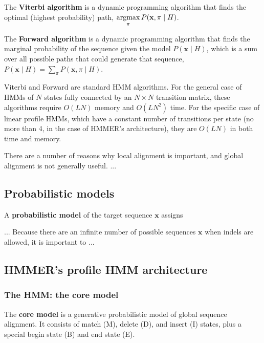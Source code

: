 \documentclass[11pt]{article}
\begin{document}
The \textbf{Viterbi algorithm} is a dynamic programming algorithm that
finds the optimal (highest probability) path, $\mathop{\mathrm{argmax}}\limits_\pi
P(\mathbf{x}, \pi \mid H)$.

The \textbf{Forward algorithm} is a dynamic programming algorithm that
finds the marginal probability of the sequence given the model
$P(\mathbf{x} \mid H)$, which is a sum over all possible paths that
could generate that sequence, $P(\mathbf{x} \mid H) = \sum_\pi
P(\mathbf{x}, \pi \mid H)$. 

Viterbi and Forward are standard HMM algorithms. For the general case
of HMMs of $N$ states fully connected by an $N \times N$ transition
matrix, these algorithms require $O(LN)$ memory and $O(LN^2)$ time.
For the specific case of linear profile HMMs, which have a constant
number of transitions per state (no more than 4, in the case of
HMMER's architecture), they are $O(LN)$ in both time and memory.
















There are a number of reasons why local alignment is important, and
global alignment is not generally useful. ...

\subsection{Probabilistic models}

A \textbf{probabilistic model} of the target sequence $\mathbf{x}$
assigns


... Because there are an infinite number of possible sequences
$\mathbf{x}$ when indels are allowed, it is important to  ...



\subsection{HMMER's profile HMM architecture}




\subsubsection{The HMM: the core model}


The \textbf{core model} is a generative probabilistic model of global
sequence alignment. It consists of match (M), delete (D), and insert
(I) states, plus a special begin state (B) and end state (E).
\end{document}

